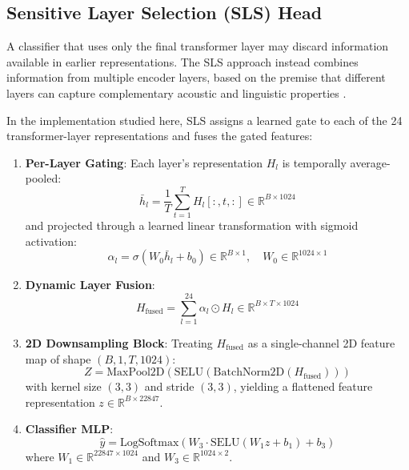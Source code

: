 \documentclass[conference]{IEEEtran}
\begin{document}
\subsection{Sensitive Layer Selection (SLS) Head}

A classifier that uses only the final transformer layer may discard information available in earlier representations. The SLS approach instead combines information from multiple encoder layers, based on the premise that different layers can capture complementary acoustic and linguistic properties \cite{zhang2024sensitive}.

In the implementation studied here, SLS assigns a learned gate to each of the 24 transformer-layer representations and fuses the gated features:

\begin{enumerate}
    \item \textbf{Per-Layer Gating}: Each layer's representation $H_l$ is temporally average-pooled:
    \begin{equation}
        \bar{h}_l = \frac{1}{T} \sum_{t=1}^T H_l[:, t, :]
        \in \mathbb{R}^{B \times 1024}
    \end{equation}
    and projected through a learned linear transformation with sigmoid activation:
    \begin{equation}
        \alpha_l = \sigma(W_0 \bar{h}_l + b_0)
        \in \mathbb{R}^{B \times 1},
        \quad W_0 \in \mathbb{R}^{1024 \times 1}
    \end{equation}

    \item \textbf{Dynamic Layer Fusion}:
    \begin{equation}
        H_{\text{fused}} =
        \sum_{l=1}^{24} \alpha_l \odot H_l
        \in \mathbb{R}^{B \times T \times 1024}
    \end{equation}

    \item \textbf{2D Downsampling Block}: Treating $H_{\text{fused}}$ as a single-channel 2D feature map of shape $(B, 1, T, 1024)$:
    \begin{equation}
        Z = \text{MaxPool2D}
        (\text{SELU}(\text{BatchNorm2D}(H_{\text{fused}})))
    \end{equation}
    with kernel size $(3, 3)$ and stride $(3, 3)$, yielding a flattened feature representation $z \in \mathbb{R}^{B \times 22847}$.

    \item \textbf{Classifier MLP}:
    \begin{equation}
        \hat{y} =
        \text{LogSoftmax}
        (W_3 \cdot \text{SELU}(W_1 z + b_1) + b_3)
    \end{equation}
    where $W_1 \in \mathbb{R}^{22847 \times 1024}$ and
    $W_3 \in \mathbb{R}^{1024 \times 2}$.
\end{enumerate}
\end{document}
